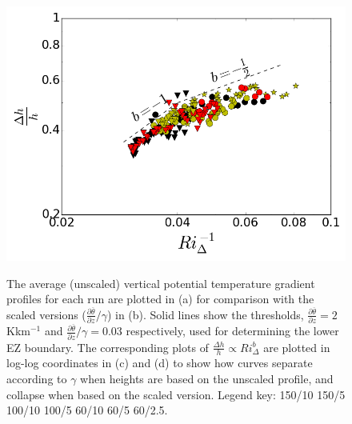 \documentclass[referee]{svjour3}
\begin{document}
\begin{figure}[htbp]
\begin{minipage}[b]{0.5\linewidth}
{                \includegraphics[scale=.3]{figures/loglog_scaleddeltahinvri_4}}\\      
       
        \end{minipage}

        \caption{The average (unscaled) vertical potential temperature gradient profiles for each run are plotted in (a) for comparison with the scaled versions ($\frac{\partial \overline{\theta}}{\partial z}/\gamma$) in (b). Solid lines show the thresholds, $\frac{\partial \overline{\theta}}{\partial z}=2$Kkm$^{-1}$ and $\frac{\partial \overline{\theta}}{\partial z}/\gamma=0.03$ respectively, used for determining the lower EZ boundary.  The corresponding plots of $\frac{\Delta h}{h} \propto Ri_{\Delta} ^{b}$ are plotted in log-log coordinates in (c) and (d) to show how curves separate according to $\gamma$ when heights are based on the unscaled profile, and collapse when based on the scaled version.  Legend key:{\color{red} } 150/10  150/5 \hspace{2mm} {\color{black} } 100/10 \hspace{2mm} {\color{black} } 100/5 \hspace{2mm} {\color{offyellow} } 60/10 \hspace{2mm} {\color{offyellow} } 60/5 \hspace{2mm} {\color{offyellow} } 60/2.5.}
        \label{fig:scaleddeltahinvri}
\end{figure}
\end{document}
